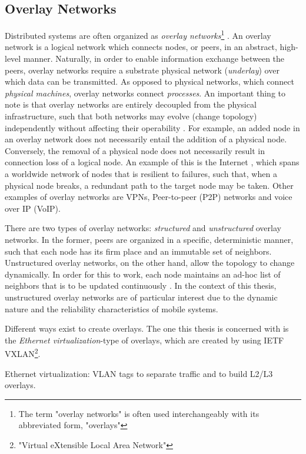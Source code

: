 \subsection{Overlay Networks}
Distributed systems are often organized as \emph{overlay networks}\footnote{The term "overlay networks" is often used interchangeably with its abbreviated form, "overlays"} \cite{tarkoma2010overlay}. An overlay network is a logical network which connects nodes, or peers, in an abstract, high-level manner. Naturally, in order to enable information exchange between the peers, overlay networks require a substrate physical network (\emph{underlay}) over which data can be transmitted. As opposed to physical networks, which connect \emph{physical machines}, overlay networks connect \emph{processes}. An important thing to note is that overlay networks are entirely decoupled from the physical infrastructure, such that both networks may evolve (change topology) independently without affecting their operability \cite{tanenbaum2017distributed}. For example, an added node in an overlay network does not necessarily entail the addition of a physical node. Conversely, the removal of a physical node does not necessarily result in connection loss of a logical node. An example of this is the Internet \cite{vaezi2017virtualization}, which spans a worldwide network of nodes that is resilient to failures, such that, when a physical node breaks, a redundant path to the target node may be taken. Other examples of overlay networks are VPNs, Peer-to-peer (P2P) networks and voice over IP (VoIP).

There are two types of overlay networks: \emph{structured} and \emph{unstructured} overlay networks. In the former, peers are organized in a specific, deterministic manner, such that each node has its firm place and an immutable set of neighbors. Unstructured overlay networks, on the other hand, allow the topology to change dynamically. In order for this to work, each node maintains an ad-hoc list of neighbors that is to be updated continuously \cite{tanenbaum2017distributed}. In the context of this thesis, unstructured overlay networks are of particular interest due to the dynamic nature and the reliability characteristics of mobile systems. 

Different ways exist to create overlays. The one this thesis is concerned with is the \emph{Ethernet virtualization}-type of overlays, which are created by using IETF VXLAN\footnote{"Virtual eXtensible Local Area Network"}. 


Ethernet virtualization: VLAN tags to separate traffic and to build L2/L3 overlays.


